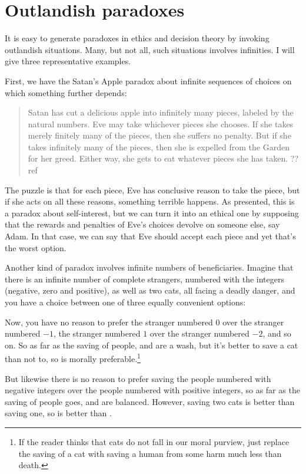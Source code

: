 \section{Outlandish paradoxes}
It is easy to generate paradoxes in ethics and decision theory by invoking outlandish situations.
Many, but not all, such situations involves infinities. I will give three representative examples.

First, we have the Satan's Apple paradox about infinite sequences of choices on which something
further depends:
\begin{quote}
Satan has cut a delicious apple into infinitely many pieces, labeled by the natural numbers. Eve
may take whichever pieces she chooses. If she takes merely finitely many of the pieces, then she
suffers no penalty. But if she takes infinitely many of the pieces, then she is expelled from the
Garden for her greed. Either way, she gets to eat whatever pieces she has taken. ??ref
\end{quote}
The puzzle is that for each piece, Eve has conclusive reason to take the piece, but if she acts on
all these reasons, something terrible happens. As presented, this is a paradox about self-interest, 
but we can turn it into an ethical one by supposing that the rewards and penalties of Eve's choices 
devolve on someone else, say Adam. In that case, we can say that Eve should accept each piece and yet
that's the worst option.

Another kind of paradox involves infinite numbers of beneficiaries. Imagine that there is an infinite
number of complete strangers, numbered with the integers (negative, zero and positive),
as well as two cats, all facing a deadly danger, and you have a choice between one of three equally convenient options:

Now, you have no reason to prefer
the stranger numbered $0$ over the stranger numbered $-1$, the stranger numbered $1$ over the
stranger numbered $-2$, and so on. So as far as the saving of people,  and 
are a wash, but it's better to save a cat than not to, so  is morally preferable.\footnote{If the
reader thinks that cats do not fall in our moral purview, just replace the saving of a cat with saving a human
from some harm much less than death.}

But likewise there is no reason to prefer saving the people numbered with negative integers over the
people numbered with positive integers, so as far as the saving of people goes,  and
 are balanced. However, saving two cats is better than saving one, so 
is better than . 


